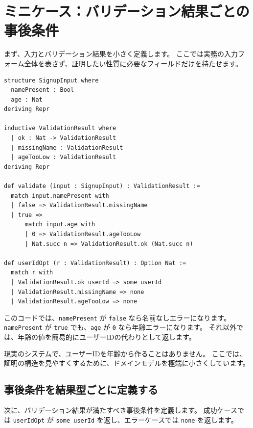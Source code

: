 
\section{ミニケース：バリデーション結果ごとの事後条件}

まず、入力とバリデーション結果を小さく定義します。
ここでは実務の入力フォーム全体を表さず、証明したい性質に必要なフィールドだけを持たせます。

\begin{listing}[htbp]
\begin{verbatim}
structure SignupInput where
  namePresent : Bool
  age : Nat
deriving Repr

inductive ValidationResult where
  | ok : Nat -> ValidationResult
  | missingName : ValidationResult
  | ageTooLow : ValidationResult
deriving Repr

def validate (input : SignupInput) : ValidationResult :=
  match input.namePresent with
  | false => ValidationResult.missingName
  | true =>
      match input.age with
      | 0 => ValidationResult.ageTooLow
      | Nat.succ n => ValidationResult.ok (Nat.succ n)

def userIdOpt (r : ValidationResult) : Option Nat :=
  match r with
  | ValidationResult.ok userId => some userId
  | ValidationResult.missingName => none
  | ValidationResult.ageTooLow => none
\end{verbatim}
\caption{\texttt{SignupInput} と \texttt{ValidationResult}}
\label{lst:ch19-validation-types}
\end{listing}

このコードでは、\texttt{namePresent} が \texttt{false} なら名前なしエラーになります。
\texttt{namePresent} が \texttt{true} でも、\texttt{age} が \texttt{0} なら年齢エラーになります。
それ以外では、年齢の値を簡易的にユーザーIDの代わりとして返します。

現実のシステムで、ユーザーIDを年齢から作ることはありません。
ここでは、証明の構造を見やすくするために、ドメインモデルを極端に小さくしています。

\subsection{事後条件を結果型ごとに定義する}

次に、バリデーション結果が満たすべき事後条件を定義します。
成功ケースでは \texttt{userIdOpt} が \texttt{some userId} を返し、エラーケースでは \texttt{none} を返します。

